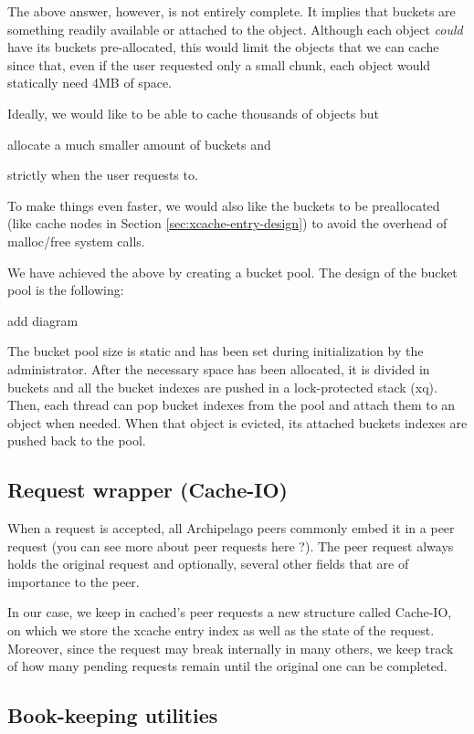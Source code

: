 The above answer, however, is not entirely complete. It implies that buckets 
are something readily available or attached to the object. Although each object 
\textit{could} have its buckets pre-allocated, this would limit the objects 
that we can cache since that, even if the user requested only a small chunk, 
each object would statically need 4MB of space.

Ideally, we would like to be able to cache thousands of objects but
\begin{inparaenum}[i)]
\item allocate a much smaller amount of buckets and
\item strictly when the user requests to.
\end{inparaenum}
To make things even faster, we would also like the buckets to be preallocated 
(like cache nodes in Section \ref{sec:xcache-entry-design}) to avoid the 
overhead of malloc/free system calls.

We have achieved the above by creating a bucket pool. The design of the bucket 
pool is the following:

\fixme add diagram

The bucket pool size is static and has been set during initialization by the 
administrator. After the necessary space has been allocated, it is divided in 
buckets and all the bucket indexes are pushed in a lock-protected stack (xq).  
Then, each thread can pop bucket indexes from the pool and attach them
to an object when needed. When that object is evicted, its attached buckets 
indexes are pushed back to the pool.

\subsection{Request wrapper (Cache-IO)}

When a request is accepted, all Archipelago peers commonly embed it in a peer 
request (you can see more about peer requests here ?). The peer request always 
holds the original request and optionally, several other fields that are of 
importance to the peer.

In our case, we keep in cached's peer requests a new structure called Cache-IO, 
on which we store the xcache entry index as well as the state of the request.  
Moreover, since the request may break internally in many others, we keep track 
of how many pending requests remain until the original one can be completed.

\subsection{Book-keeping utilities}\label{sec:cached-states-design}

